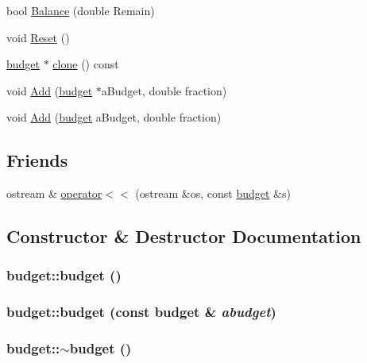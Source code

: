 \begin{DoxyCompactItemize}
bool \hyperlink{classbudget_a2814c71d2d504462defc2c85f2cd86b2}{Balance} (double Remain)
\item 
void \hyperlink{classbudget_a47533e4ef9b8907303904da10f934f74}{Reset} ()
\item 
\hyperlink{classbudget}{budget} $\ast$ \hyperlink{classbudget_a5e9d9a8fdb2a2c1f462208f054a04499}{clone} () const 
\item 
void \hyperlink{classbudget_aa775844e174ace198419686907472ae4}{Add} (\hyperlink{classbudget}{budget} $\ast$aBudget, double fraction)
\item 
void \hyperlink{classbudget_a2f378ac0b5f670cc9ec42b4e9ceb3c51}{Add} (\hyperlink{classbudget}{budget} aBudget, double fraction)
\end{DoxyCompactItemize}
\subsection*{Friends}
\begin{DoxyCompactItemize}
\item 
ostream \& \hyperlink{classbudget_a0f6087201fd909afbaebd5cb15504f1e}{operator$<$$<$} (ostream \&os, const \hyperlink{classbudget}{budget} \&s)
\end{DoxyCompactItemize}


\subsection{Constructor \& Destructor Documentation}
\hypertarget{classbudget_aba8b6c695070f8943835fed016e88e89}{
\subsubsection[{budget}]{\setlength{\rightskip}{0pt plus 5cm}budget::budget ()}}
\label{classbudget_aba8b6c695070f8943835fed016e88e89}
\hypertarget{classbudget_aecc92930fcb6f7f9c3fb3ea1ba7f12c8}{
\subsubsection[{budget}]{\setlength{\rightskip}{0pt plus 5cm}budget::budget (const {\bf budget} \& {\em abudget})}}
\label{classbudget_aecc92930fcb6f7f9c3fb3ea1ba7f12c8}
\hypertarget{classbudget_a449b93cd2025dabca2678109e890eb6f}{
\subsubsection[{$\sim$budget}]{\setlength{\rightskip}{0pt plus 5cm}budget::$\sim$budget ()}}
\label{classbudget_a449b93cd2025dabca2678109e890eb6f}


